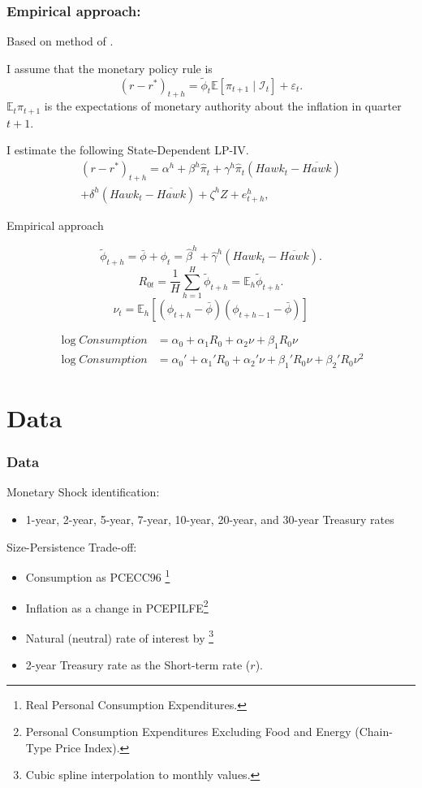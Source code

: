 \documentclass[11pt,pdf,aspectratio=129]{beamer}
\begin{document}
\begin{frame}\frametitle{Empirical approach:}
Based on method of \citet{HIM2023}.

I assume that the monetary policy rule is 
\[\left(r-r^*\right)_{t+h}=\tilde\phi_t\mathbb{E}\left[\pi_{t+1}\mid \mathcal{I}_t\right]+\varepsilon_t.\]
$\mathbb{E}_t\pi_{t+1}$ is the expectations of monetary authority about the inflation in quarter $t+1$.

I estimate the following State-Dependent LP-IV.
\begin{multline*}
    \left(r-r^*\right)_{t+h}=\alpha^h+\beta^h \hat\pi_t+\gamma^h \hat\pi_t\left(\mathit{Hawk}_{t}-\overline{\mathit{Hawk}}\right)\\ +\delta^h\left(\mathit{Hawk}_{t}-\overline{\mathit{Hawk}}\right)+\zeta^hZ+e_{t+h}^h,
\end{multline*}
\end{frame}

\begin{frame}{Empirical approach }

    \[\tilde \phi_{t+h}=\bar\phi+\phi_t=\hat \beta^h+\hat\gamma^h \left(\mathit{Hawk}_{t}-\overline{\mathit{Hawk}}\right).\]
    \[R_{0t}=\frac{1}{H}\sum_{h=1}^{H} \tilde \phi_{t+h}=\mathbb{E}_h \tilde \phi_{t+h}.\]
    \[\nu_t=\mathbb{E}_{h}\left[\left(\phi_{t+h}-\bar \phi\right)\left(\phi_{t+h-1}-\bar \phi\right)\right]\]

    \begin{align}
        \log \mathit{Consumption}&=\alpha_0+\alpha_1 R_0+\alpha_2\nu+\beta_1 R_0\nu \label{eq:linear}\\
        \log \mathit{Consumption}&=\alpha_0'+\alpha_1' R_0+\alpha_2'\nu+\beta_1' R_0\nu + \beta_2' R_0\nu^2\label{eq:quadratic}
    \end{align} 
\end{frame}






\section{Data}
\begin{frame}\frametitle{Data}
    Monetary Shock identification:
    \begin{itemize}
        \item  1-year, 2-year, 5-year, 7-year, 10-year, 20-year, and 30-year Treasury rates 
    \end{itemize}
Size-Persistence Trade-off:
\begin{itemize}
    \item Consumption as PCECC96 \footnote{Real Personal Consumption Expenditures.} \footnotemark[7]
        \item Inflation as a change in PCEPILFE\footnote{Personal Consumption Expenditures Excluding Food and Energy (Chain-Type Price Index).} 
        \item Natural (neutral) rate of interest by \citet{HLW2017}\footnote{Cubic spline interpolation to monthly values.}
        \item 2-year Treasury rate as the Short-term rate ($r$).
    \end{itemize}
\end{frame}
\end{document}
